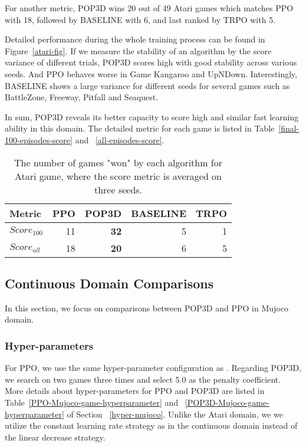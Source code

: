 \documentclass{article}
\begin{document}
For another metric, POP3D wins 20 out of 49 Atari games which matches PPO with 18, followed by BASELINE with 6, and last ranked by TRPO with 5. 

Detailed performance during the whole training process can be found in Figure~\ref{atari-fig}. If we measure the stability of an algorithm by the score variance of different trials, POP3D scores high with good stability across various seeds. And PPO behaves worse  in Game Kangaroo and UpNDown. Interestingly, BASELINE shows a large variance for different seeds for several games such as BattleZone, Freeway, Pitfall and Seaquest.

In sum, POP3D reveals its better capacity to score high and similar fast learning ability in this domain. 
The detailed metric for each game is listed in Table~\ref{final-100-episodes-score} and ~\ref{all-episodes-score}.
\begin{table}
	\begin{center}
		\begin{tabular}{lrrrr}
			\toprule
			Metric & PPO & POP3D & BASELINE & TRPO \\
			\midrule
			$Score_{100}$ & 11 &\textbf{32} & 5 & 1 \\
			$Score_{all}$  & 18 & \textbf{20} &6 &5\\
			\bottomrule
		\end{tabular}
	\end{center}
	\caption{The number of games "won" by each algorithm for Atari game, where the score metric is averaged on three seeds.}
	\label{atari_comparison_summary}
\end{table}

\subsection{Continuous Domain Comparisons}

In this section, we focus on comparisons between POP3D and PPO in Mujoco domain.

\subsubsection{Hyper-parameters}

For PPO, we use the same  hyper-parameter configuration as \cite{2017arXiv170706347S}. Regarding POP3D, we search on two games  three times and select 5.0 as the penalty coefficient. More details about hyper-parameters for PPO and POP3D  are listed in Table~\ref{PPO-Mujoco-game-hyperparameter} and ~\ref{POP3D-Mujoco-game-hyperparameter} of Section~ \ref{hyper-mujoco}. Unlike the Atari domain,  we we utilize the constant learning rate  strategy as \cite{2017arXiv170706347S} in the continuous domain instead of the linear decrease strategy.
\end{document}

